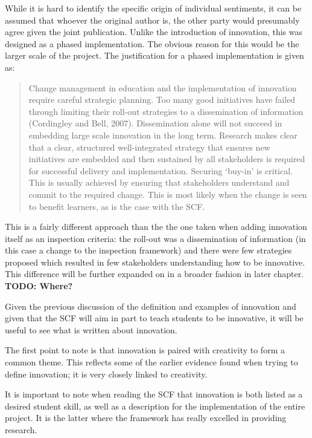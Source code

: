 While it is hard to identify the specific origin of individual sentiments, it can be assumed that whoever the original author is, the other party would presumably agree given the joint publication. Unlike the introduction of innovation, this was designed as a phased implementation. The obvious reason for this would be the larger scale of the project. The justification for a phased implementation is given as:

\begin{quote}
Change management in education and the implementation of innovation require careful strategic planning. Too many good initiatives have failed through limiting their roll-out strategies to a dissemination of information (Cordingley and Bell, 2007). Dissemination alone will not succeed in embedding large scale innovation in the long term. Research makes clear that a clear, structured well-integrated strategy that ensures new initiatives are embedded and then sustained by all stakeholders is required for successful delivery and implementation. Securing ‘buy-in’ is critical. This is usually achieved by ensuring that stakeholders understand and commit to the required change. This is most likely when the change is seen to benefit learners, as is the case with the SCF.
\end{quote}

This is a fairly different approach than the the one taken when adding innovation itself as an inspection criteria: the roll-out was a dissemination of information (in this case a change to the inspection framework) and there were few strategies proposed which resulted in few stakeholders understanding how to be innovative. This difference will be further expanded on in a broader fashion in later chapter. \textbf{TODO: Where?}

Given the previous discussion of the definition and examples of innovation and given that the SCF will aim in part to teach students to be innovative, it will be useful to see what is written about innovation.

The first point to note is that innovation is paired with creativity to form a common theme. This reflects some of the earlier evidence found when trying to define innovation; it is very closely linked to creativity.

It is important to note when reading the SCF that innovation is both listed as a desired student skill, as well as a description for the implementation of the entire project. It is the latter where the framework has really excelled in providing research.

